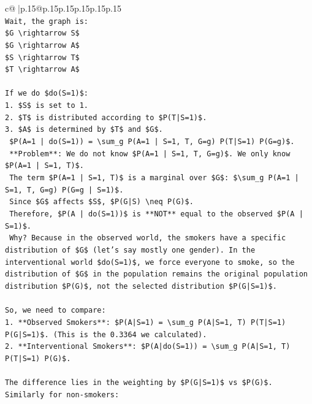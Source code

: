 \documentclass{article}
\begin{document}
{\begin{supertabular}{c@{$\;$}|p{.15\linewidth}@{}p{.15\linewidth}p{.15\linewidth}p{.15\linewidth}p{.15\linewidth}p{.15\linewidth}}
{{{\\ 
\texttt{Wait, the graph is:} \\
\texttt{\$G \textbackslash{}rightarrow S\$} \\
\texttt{\$G \textbackslash{}rightarrow A\$} \\
\texttt{\$S \textbackslash{}rightarrow T\$} \\
\texttt{\$T \textbackslash{}rightarrow A\$} \\
\\ 
\texttt{If we do \$do(S=1)\$:} \\
\texttt{1.  \$S\$ is set to 1.} \\
\texttt{2.  \$T\$ is distributed according to \$P(T|S=1)\$.} \\
\texttt{3.  \$A\$ is determined by \$T\$ and \$G\$.} \\
\texttt{    \$P(A=1 | do(S=1)) = \textbackslash{}sum\_g P(A=1 | S=1, T, G=g) P(T|S=1) P(G=g)\$.} \\
\texttt{    **Problem**: We do not know \$P(A=1 | S=1, T, G=g)\$. We only know \$P(A=1 | S=1, T)\$.} \\
\texttt{    The term \$P(A=1 | S=1, T)\$ is a marginal over \$G\$: \$\textbackslash{}sum\_g P(A=1 | S=1, T, G=g) P(G=g | S=1)\$.} \\
\texttt{    Since \$G\$ affects \$S\$, \$P(G|S) \textbackslash{}neq P(G)\$.} \\
\texttt{    Therefore, \$P(A | do(S=1))\$ is **NOT** equal to the observed \$P(A | S=1)\$.} \\
\texttt{    Why? Because in the observed world, the smokers have a specific distribution of \$G\$ (let's say mostly one gender). In the interventional world \$do(S=1)\$, we force everyone to smoke, so the distribution of \$G\$ in the population remains the original population distribution \$P(G)\$, not the selected distribution \$P(G|S=1)\$.} \\
\\ 
\texttt{So, we need to compare:} \\
\texttt{1.  **Observed Smokers**: \$P(A|S=1) = \textbackslash{}sum\_g P(A|S=1, T) P(T|S=1) P(G|S=1)\$. (This is the 0.3364 we calculated).} \\
\texttt{2.  **Interventional Smokers**: \$P(A|do(S=1)) = \textbackslash{}sum\_g P(A|S=1, T) P(T|S=1) P(G)\$.} \\
\\ 
\texttt{The difference lies in the weighting by \$P(G|S=1)\$ vs \$P(G)\$.} \\
\texttt{Similarly for non{-}smokers:} \\
}}}
\end{supertabular}}
\end{document}
